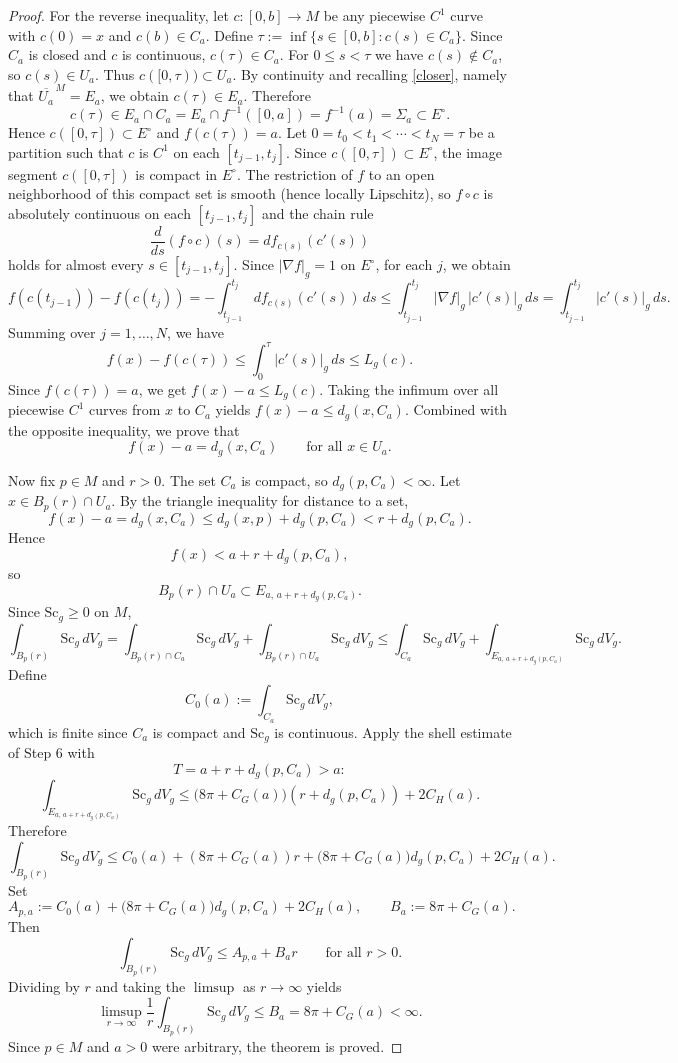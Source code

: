 \documentclass[12pt,oneside,a4paper]{article}
\theoremstyle{mytheorem}
\theoremstyle{remark}
\begin{document}
\begin{proof}
For the reverse inequality, let $c:[0,b]\to M$ be any piecewise $C^1$ curve with $c(0)=x$ and $c(b)\in C_a$. Define
$\tau:=\inf\{s\in[0,b]:c(s)\in C_a\}.$ Since $C_a$ is closed and $c$ is continuous, $c(\tau)\in C_a$. For $0\le s<\tau$ we have $c(s)\notin C_a$, so $c(s)\in U_a$. Thus $c([0,\tau))\subset U_a$. By continuity and recalling \eqref{closer}, namely that $\overline{U_a}^{\,M}=E_a$, we obtain
$c(\tau)\in E_a .$
Therefore
\[
c(\tau)\in E_a\cap C_a=E_a\cap f^{-1}([0,a])=f^{-1}(a)=\Sigma_a\subset E^\circ.
\]
Hence $c([0,\tau])\subset E^\circ$ and $f(c(\tau))=a$. Let
$0=t_0<t_1<\cdots<t_N=\tau$
be a partition such that $c$ is $C^1$ on each $[t_{j-1},t_j]$. Since $c([0,\tau])\subset E^\circ$, the image segment $c([0,\tau])$ is compact in $E^\circ$. The restriction of $f$ to an open neighborhood of this compact set is smooth (hence locally Lipschitz), so $f\circ c$ is absolutely continuous on each $[t_{j-1},t_j]$ and the chain rule
\[
\frac{d}{ds}(f\circ c)(s)=df_{c(s)}(c'(s))
\]
holds for almost every $s\in[t_{j-1},t_j]$. Since $|\nabla f|_g=1$ on $E^\circ$, for each $j$, we obtain
\[
f(c(t_{j-1}))-f(c(t_j))=-\int_{t_{j-1}}^{t_j}df_{c(s)}(c'(s))\,ds\le\int_{t_{j-1}}^{t_j}|\nabla f|_g\,|c'(s)|_g\,ds=\int_{t_{j-1}}^{t_j}|c'(s)|_g\,ds.
\]
 Summing over $j=1,\dots,N$, we have 
\[
f(x)-f(c(\tau))\le\int_0^\tau|c'(s)|_g\,ds\le L_g(c).
\]
Since $f(c(\tau))=a$, we get $f(x)-a\le L_g(c).$
Taking the infimum over all piecewise $C^1$ curves from $x$ to $C_a$ yields $f(x)-a\le d_g(x,C_a)$. Combined with the opposite inequality, we prove that 
\[
f(x)-a=d_g(x,C_a)\qquad\text{for all }x\in U_a.
\]

Now fix $p\in M$ and $r>0$. The set $C_a$ is compact, so $d_g(p,C_a)<\infty$. Let $x\in B_p(r)\cap U_a$. By the triangle inequality for distance to a set,
\[
f(x)-a=d_g(x,C_a)\le d_g(x,p)+d_g(p,C_a)<r+d_g(p,C_a).
\]
Hence
\[
f(x)<a+r+d_g(p,C_a),
\]
so
\[
B_p(r)\cap U_a\subset E_{a,\,a+r+d_g(p,C_a)}.
\]
Since $\mathrm{Sc}_g\ge 0$ on $M$,
\[
\int_{B_p(r)} \mathrm{Sc}_g \, dV_g = \int_{B_p(r) \cap C_a} \mathrm{Sc}_g \, dV_g + \int_{B_p(r) \cap U_a} \mathrm{Sc}_g \, dV_g\le\int_{C_a}\mathrm{Sc}_g\,dV_g+\int_{E_{a,\,a+r+d_g(p,C_a)}}\mathrm{Sc}_g\,dV_g.
\]
Define
\[
C_0(a):=\int_{C_a}\mathrm{Sc}_g\,dV_g,
\]
which is finite since $C_a$ is compact and $\mathrm{Sc}_g$ is continuous. Apply the shell estimate of Step 6 with
\[
T=a+r+d_g(p,C_a)>a:
\]
\[
\int_{E_{a,\,a+r+d_g(p,C_a)}}\mathrm{Sc}_g\,dV_g\le\bigl(8\pi+C_G(a)\bigr)(r+d_g(p,C_a))+2C_H(a).
\]
Therefore
\[
\int_{B_p(r)}\mathrm{Sc}_g\,dV_g\le C_0(a)+(8\pi+C_G(a))r+\bigl(8\pi+C_G(a)\bigr)d_g(p,C_a)+2C_H(a).
\]
Set
\[
A_{p,a}:=C_0(a)+\bigl(8\pi+C_G(a)\bigr)d_g(p,C_a)+2C_H(a),\qquad B_a:=8\pi+C_G(a).
\]
Then
\[
\int_{B_p(r)}\mathrm{Sc}_g\,dV_g\le A_{p,a}+B_a r\qquad\text{for all }r>0.
\]
Dividing by $r$ and taking the $\limsup$ as $r\to\infty$ yields
\[
\limsup_{r\to\infty}\frac{1}{r}\int_{B_p(r)}\mathrm{Sc}_g\,dV_g\le B_a=8\pi+C_G(a)<\infty.
\]
Since $p\in M$ and $a>0$ were arbitrary, the theorem is proved.
\end{proof}
\end{document}
